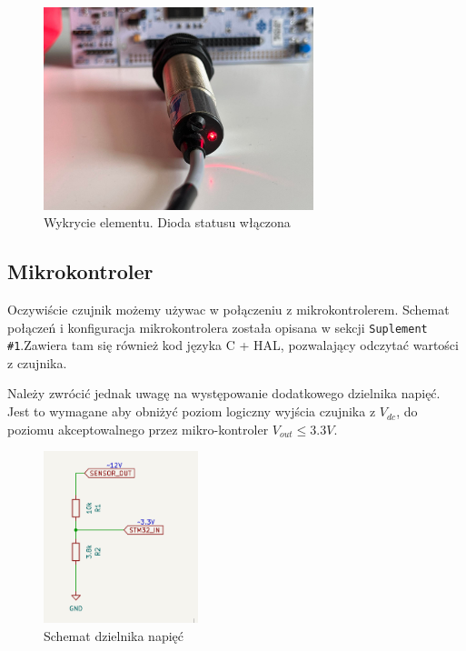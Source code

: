 \documentclass[11pt, a4paper]{article}
\begin{document}
\begin{figure}[h!]
    \centering
    \includegraphics[angle=0, width=0.7\textwidth]{fig/SCOO/stnd2-on.jpg}
    \caption{Wykrycie elementu. Dioda statusu włączona}
\end{figure}

\newpage
\subsection{Mikrokontroler}
Oczywiście czujnik możemy używac w połączeniu z mikrokontrolerem. Schemat połączeń i konfiguracja
mikrokontrolera została opisana w sekcji \texttt{Suplement \#1}.Zawiera tam się również kod języka
C + HAL, pozwalający odczytać wartości z czujnika.

Należy zwrócić jednak uwagę na występowanie dodatkowego dzielnika napięć. Jest to wymagane aby obniżyć poziom logiczny wyjścia
czujnika z $V_{dc}$, do poziomu akceptowalnego przez mikro-kontroler $V_{out} \le 3.3V$.

\begin{figure}[h!]
    \centering
    \includegraphics[width=0.4\textwidth]{fig/SCOO/res.png}
    \caption{Schemat dzielnika napięć}
\end{figure}
\end{document}

